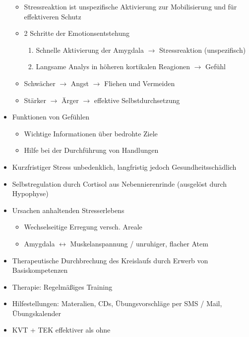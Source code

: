 \documentclass[11pt, paper=a4, twocolumn]{scrartcl}
\begin{document}
\begin{itemize}
\begin{itemize}
					\item Stressreaktion ist unspezifische Aktivierung zur Mobilisierung und für effektiveren Schutz
					\item 2 Schritte der Emotionsentstehung
						\begin{enumerate}
							\item Schnelle Aktivierung der Amygdala $\rightarrow$ Stressreaktion (unspezifisch)
							\item Langsame Analys in höheren kortikalen Reagionen $\rightarrow$ Gefühl
						\end{enumerate}
					\item Schwächer $\rightarrow$ Angst $\rightarrow$ Fliehen und Vermeiden
					\item Stärker $\rightarrow$ Ärger $\rightarrow$ effektive Selbstdurchsetzung
				\end{itemize}
			\item Funktionen von Gefühlen
				\begin{itemize}
					\item Wichtige Informationen über bedrohte Ziele
					\item Hilfe bei der Durchführung von Handlungen
				\end{itemize}
			\item Kurzfristiger Stress unbedenklich, langfristig jedoch Gesundheitsschädlich
			\item Selbstregulation durch Cortisol aus Nebennierenrinde (ausgelöst durch Hypophyse)
			\item Ursachen anhaltenden Stresserlebens
				\begin{itemize}
					\item Wechselseitige Erregung versch. Areale
					\item Amygdala $\leftrightarrow$ Muskelanspannung / unruhiger, flacher Atem
				\end{itemize}
			\item Therapeutische Durchbrechung des Kreislaufs durch Erwerb von Basiskompetenzen
			\item Therapie: Regelmäßiges Training
			\item Hilfestellungen: Materalien, CDs, Übungsvorschläge per SMS / Mail, Übungskalender
			\item KVT + TEK effektiver als ohne
		\end{itemize}
\end{document}
